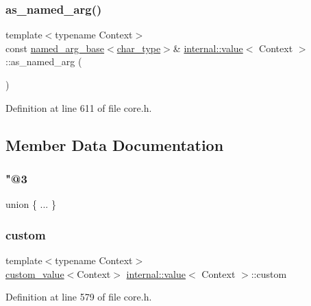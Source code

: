 \subsubsection{\texorpdfstring{as\+\_\+named\+\_\+arg()}{as\_named\_arg()}}
{\footnotesize\ttfamily template$<$typename Context$>$ \\
const \hyperlink{structinternal_1_1named__arg__base}{named\+\_\+arg\+\_\+base}$<$\hyperlink{classinternal_1_1value_aea7e71c59ab9961b645ed79e69aff80e}{char\+\_\+type}$>$\& \hyperlink{classinternal_1_1value}{internal\+::value}$<$ Context $>$\+::as\+\_\+named\+\_\+arg (\begin{DoxyParamCaption}{ }\end{DoxyParamCaption})\hspace{0.3cm}{\ttfamily [inline]}}



Definition at line 611 of file core.\+h.



\subsection{Member Data Documentation}
\mbox{\label{classinternal_1_1value_af56b051449beb21c2f8dfc6b0a63dee2}} 
\subsubsection{\texorpdfstring{"@3}{@3}}
{\footnotesize\ttfamily union \{ ... \} }

\mbox{\label{classinternal_1_1value_aa9a9cd49300dc090a73acf6757a98ff2}} 
\subsubsection{\texorpdfstring{custom}{custom}}
{\footnotesize\ttfamily template$<$typename Context$>$ \\
\hyperlink{structinternal_1_1custom__value}{custom\+\_\+value}$<$Context$>$ \hyperlink{classinternal_1_1value}{internal\+::value}$<$ Context $>$\+::custom}



Definition at line 579 of file core.\+h.

\mbox{\label{classinternal_1_1value_a6a96bedffbc80c761fe5899f5859f2f0}} 
